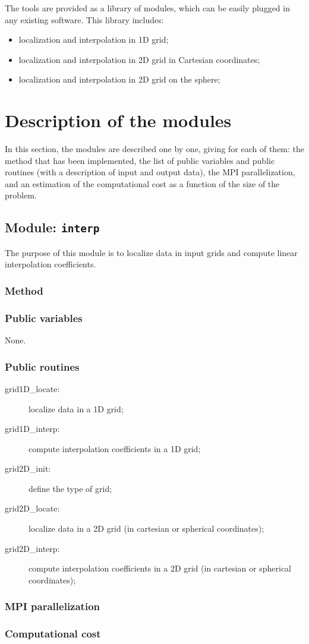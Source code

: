 \documentclass[11pt]{article}
\begin{document}
The tools are provided as a library of modules,
which can be easily plugged in any existing software.
This library includes:

\begin{itemize}
\item localization and interpolation in 1D grid;
\item localization and interpolation in 2D grid in Cartesian coordinates;
\item localization and interpolation in 2D grid on the sphere;
\end{itemize}

\clearpage

\pagestyle{plain}

\section{Description of the modules}

In this section,
the modules are described one by one,
giving for each of them:
the method that has been implemented,
the list of public variables and public routines
(with a description of input and output data),
the MPI parallelization, and
an estimation of the computational cost
as a function of the size of the problem.

\subsection{Module: {\tt\bf interp}}

The purpose of this module is to localize data in input grids
and compute linear interpolation coefficients.

\subsubsection*{Method}

\subsubsection*{Public variables}

None.

\subsubsection*{Public routines}

\begin{description}
\item[grid1D\_locate:] localize data in a 1D grid;
\item[grid1D\_interp:] compute interpolation coefficients in a 1D grid;
\item[grid2D\_init:] define the type of grid;
\item[grid2D\_locate:] localize data in a 2D grid (in cartesian or spherical coordinates);
\item[grid2D\_interp:] compute interpolation coefficients in a 2D grid (in cartesian or spherical coordinates);
\end{description}

\subsubsection*{MPI parallelization}

\subsubsection*{Computational cost}
\end{document}
